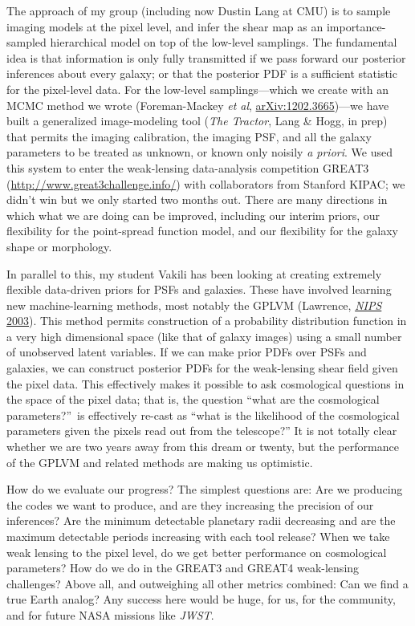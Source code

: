 \documentclass[11pt, letterpaper]{article}
\newcommand{\arxiv}[1]{\href{http://arxiv.org/abs/#1}{arXiv:#1}}
\begin{document}
The approach of my group (including now Dustin Lang at CMU) is to sample
imaging models at the pixel level, and infer the shear map as an
importance-sampled hierarchical model on top of the low-level
samplings.
The fundamental idea is that information is only fully transmitted if
we pass forward our posterior inferences about every galaxy; or that the
posterior PDF is a sufficient statistic for the pixel-level data.
For the low-level samplings---which we create with an MCMC method we
wrote (Foreman-Mackey \textit{et al}, \arxiv{1202.3665})---we have
built a generalized image-modeling tool (\textsl{The Tractor}, Lang \&
Hogg, in prep) that permits the imaging calibration, the imaging PSF,
and all the galaxy parameters to be treated as unknown, or known only noisily
\textit{a priori}.
We used this system to enter the weak-lensing data-analysis
competition GREAT3 (\url{http://www.great3challenge.info/})
with collaborators from Stanford KIPAC;
we didn't win but we only started two months out.
There are many directions in which what we are doing can be improved,
including our interim priors, our flexibility for the point-spread
function model, and our flexibility for the galaxy shape or
morphology.

In parallel to this, my student Vakili has been looking at creating
extremely flexible data-driven priors for PSFs and galaxies.
These have involved learning new machine-learning methods,
most notably the GPLVM
(Lawrence, \href{http://papers.nips.cc/paper/2540-gaussian-process-latent-variable-models-for-visualisation-of-high-dimensional-data.pdf}{\textit{NIPS} 2003}).
This method permits construction of a probability distribution
function in a very high dimensional space (like that of galaxy images)
using a small number of unobserved latent variables.
If we can make prior PDFs over PSFs and galaxies, we can construct
posterior PDFs for the weak-lensing shear field given the pixel data.
This effectively makes it possible to ask cosmological questions in
the space of the pixel data; that is, the question ``what are the
cosmological parameters?''\ is effectively re-cast as ``what is the
likelihood of the cosmological parameters given the pixels read out
from the telescope?''
It is not totally clear whether we are two years away from this dream
or twenty, but the performance of the GPLVM and related methods are
making us optimistic.

How do we evaluate our progress?
The simplest questions are: Are we producing the codes we want to
produce, and are they increasing the precision of our inferences?
Are the minimum detectable planetary radii decreasing and are the
maximum detectable periods increasing with each tool release?
When we take weak lensing to the pixel level, do we get better
performance on cosmological parameters?
How do we do in the GREAT3 and GREAT4 weak-lensing challenges?
Above all, and outweighing all other metrics combined:
Can we find a true Earth analog?
Any success here would be huge, for us, for the community, and for
future NASA missions like \textsl{JWST}.
\end{document}
